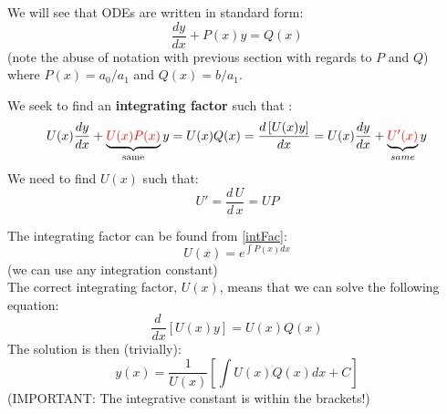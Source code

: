 \noindent{} \par
\vspace{0.75cm}



We will see that ODEs are written in standard form:
\begin{equation}
\boxed{\frac{dy}{dx}+P(x) y=Q(x)}
\end{equation}
(note the abuse of notation with previous section with regards to $P$ and $Q$)\\
where $P(x)=a_0/a_1$ and $Q(x)=b/a_1$.\par

We seek to find an \textbf{integrating factor} such that :
\begin{equation*}
U(x)\frac{dy}{dx}+\underbrace{\textcolor{red}{U(x)P(x)}}_\text{same} y=U(x)Q(x) = \frac{d\, [U(x) y]}{dx} =U(x)\frac{dy}{dx}+\underbrace{\textcolor{red}{U'(x)}}_{same} y 
\end{equation*}
 We need to find $U(x)$ such that:
 \begin{equation}
 U' = \frac{d\, U}{d\,x}= UP
 \label{intFac}
 \end{equation}


The integrating factor can be found from \eqref{intFac}:
 \begin{equation*}
U(x) = e^{\int P(x) dx}
 \end{equation*}
(we can use any integration constant)\\

The correct integrating factor, $U(x)$, means that we can solve the following equation:
\begin{equation*}
\frac{d\,}{dx}\left[U(x) y\right]= U(x)Q(x)
\end{equation*}
The solution is then (trivially):
\begin{equation}
y(x)=\frac{1}{U(x)}\left[\int U(x)Q(x)dx + C \right]
\end{equation}
(IMPORTANT: The integrative constant is within the brackets!)


